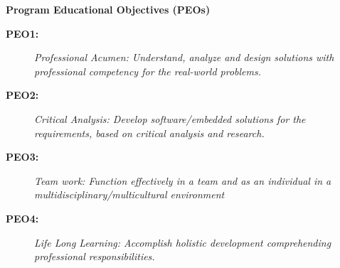 \begin{center}
  {\color{christBlue}\bfseries\LARGE Program Educational Objectives (PEOs)\par}
\end{center}
\begin{tcolorbox}[christgreenbox]
\begin{description}
  \item[\textbf{PEO1:}] \textit{Professional Acumen: Understand, analyze and design solutions with professional competency for the real-world problems.}
  \item[\textbf{PEO2:}] \textit{Critical Analysis: Develop software/embedded solutions for the requirements, based on critical analysis and research.}
  \item[\textbf{PEO3:}] \textit{Team work: Function effectively in a team and as an individual in a multidisciplinary/multicultural environment}
  \item[\textbf{PEO4:}] \textit{Life Long Learning: Accomplish holistic development comprehending professional responsibilities.}
\end{description}
\end{tcolorbox}

